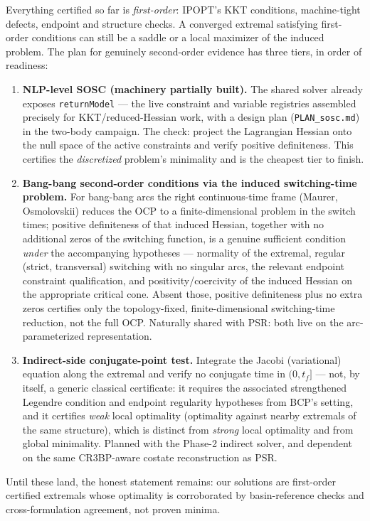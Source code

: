 \documentclass[11pt]{article}
\begin{document}
Everything certified so far is \emph{first-order}: IPOPT's KKT conditions,
machine-tight defects, endpoint and structure checks. A converged extremal
satisfying first-order conditions can still be a saddle or a local
maximizer of the induced problem. The plan for genuinely second-order
evidence has three tiers, in order of readiness:
\begin{enumerate}
\item \textbf{NLP-level SOSC (machinery partially built).} The shared
  solver already exposes \texttt{returnModel} --- the live constraint and
  variable registries assembled precisely for KKT/reduced-Hessian work, with
  a design plan (\texttt{PLAN\_sosc.md}) in the two-body campaign. The
  check: project the Lagrangian Hessian onto the null space of the active
  constraints and verify positive definiteness. This certifies the
  \emph{discretized} problem's minimality and is the cheapest tier to
  finish.
\item \textbf{Bang-bang second-order conditions via the induced
  switching-time problem.} For bang-bang arcs the right continuous-time
  frame (Maurer, Osmolovskii) reduces the OCP to a finite-dimensional
  problem in the switch times; positive definiteness of that induced
  Hessian, together with no additional zeros of the switching function, is
  a genuine sufficient condition \emph{under} the accompanying hypotheses
  --- normality of the extremal, regular (strict, transversal) switching
  with no singular arcs, the relevant endpoint constraint qualification,
  and positivity/coercivity of the induced Hessian on the appropriate
  critical cone. Absent those, positive definiteness plus no extra zeros
  certifies only the topology-fixed, finite-dimensional switching-time
  reduction, not the full OCP. Naturally shared with PSR: both live on the
  arc-parameterized representation.
\item \textbf{Indirect-side conjugate-point test.} Integrate the Jacobi
  (variational) equation along the extremal and verify no conjugate time in
  $(0, t_f]$ \cite{BCP2010} --- not, by itself, a generic classical
  certificate: it requires the associated strengthened Legendre condition
  and endpoint regularity hypotheses from BCP's setting, and it certifies
  \emph{weak} local optimality (optimality against nearby extremals of the
  same structure), which is distinct from \emph{strong} local optimality
  and from global minimality. Planned with the Phase-2 indirect solver, and
  dependent on the same CR3BP-aware costate reconstruction as PSR.
\end{enumerate}
Until these land, the honest statement remains: our solutions are
first-order certified extremals whose optimality is corroborated by
basin-reference checks and cross-formulation agreement, not proven minima.
\end{document}
